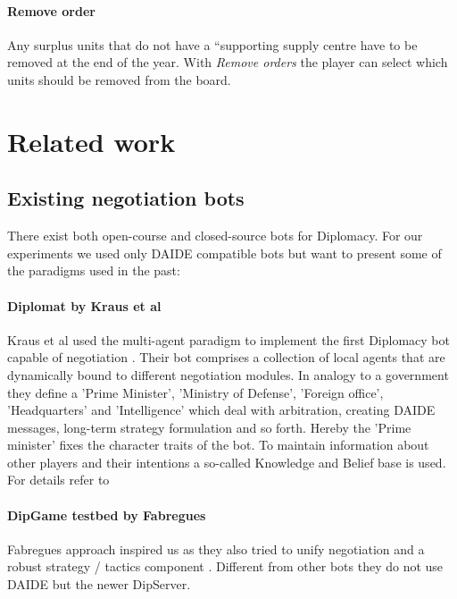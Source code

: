 \documentclass[pdftex,12pt,a4paper]{report}
\begin{document}
\paragraph{Remove order}
Any surplus units that do not have a ``supporting supply centre have
to be removed at the end of the year. With \textit{Remove orders} the
player can select which units should be removed from the board.


\pagebreak

\section{Related work}

\subsection{Existing negotiation bots}

There exist both open-course and closed-source
bots for Diplomacy. For our experiments we used only DAIDE
compatible bots but want to present some of the paradigms
used in the past:

\paragraph{Diplomat by Kraus et al}

Kraus et al used the multi-agent paradigm to implement the first
Diplomacy bot capable of negotiation \cite{Kraus95}. Their bot
comprises a collection of local agents that are dynamically bound to
different negotiation modules. In analogy to a government they define
a 'Prime Minister', 'Ministry of Defense', 'Foreign office',
'Headquarters' and 'Intelligence' which deal with arbitration,
creating DAIDE messages, long-term strategy formulation and so
forth. Hereby the 'Prime minister' fixes the character traits of the
bot. To maintain information about other players and their intentions
a so-called Knowledge and Belief base is used. For details refer to
\cite{Kraus88}

\paragraph{DipGame testbed by Fabregues}

Fabregues approach inspired us as they also tried to unify negotiation
and a robust strategy / tactics component \cite{Fabregues11}. Different
from other bots they do not use DAIDE but the newer DipServer. 
\end{document}

